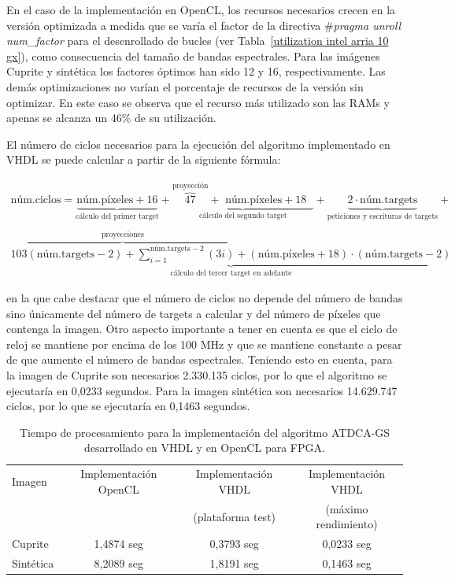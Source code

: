 En el caso de la implementación en OpenCL, los recursos necesarios crecen en la versión optimizada a medida que se varía el factor de la directiva \#\textit{pragma unroll num\_factor} para el desenrollado de bucles (ver Tabla~\ref{utilization intel arria 10 gx}), como consecuencia del tamaño de bandas espectrales. Para las imágenes Cuprite y sintética los factores óptimos han sido 12 y 16, respectivamente. Las demás optimizaciones no varían el porcentaje de recursos de la versión sin optimizar. En este caso se observa que el recurso más utilizado son las RAMs y apenas se alcanza un 46\% de su utilización.

El número de ciclos necesarios para la ejecución del algoritmo implementado en VHDL se puede calcular a partir de la siguiente fórmula:

\begin{gather}\label{eq:numero de ciclos algoritmo}
\text{núm.ciclos} = \underbrace{\text{núm.píxeles} + 16}_{\text{cálculo del primer target}} + \underbrace{\overbrace{47}^{\text{proyección}} + \text{ núm.píxeles} + 18\text{ }}_{\text{cálculo del segundo target}} + \underbrace{2 \cdot \text{núm.targets}}_{\text{peticiones y escrituras de targets}} + \nonumber\\\nonumber\\
\underbrace{\overbrace{103(\text{núm.targets} - 2) + \sum_{i=1}^{\text{núm.targets} - 2} (3i)}^{\text{proyecciones}} + (\text{núm.píxeles} + 18) \cdot (\text{núm.targets} - 2)}_{\text{cálculo del tercer target en adelante}}
\end{gather}


en la que cabe destacar que el número de ciclos no depende del número de bandas sino únicamente del número de targets a calcular y del número de píxeles que contenga la imagen. Otro aspecto importante a tener en cuenta es que el ciclo de reloj se mantiene por encima de los 100 MHz y que se mantiene constante a pesar de que aumente el número de bandas espectrales. Teniendo esto en cuenta, para la imagen de Cuprite son necesarios 2.330.135 ciclos, por lo que el algoritmo se ejecutaría en 0,0233 segundos. Para la imagen sintética son necesarios 14.629.747 ciclos, por lo que se ejecutaría en 0,1463 segundos.

\begin{table}[htbp]
	\centering
	\begin{tabular}{|l|c|c|c|}
		\hline
		Imagen & Implementación OpenCL & Implementación VHDL & Implementación VHDL \\
		 &  & (plataforma test) & (máximo rendimiento) \\ \hline \hline
		Cuprite & 1,4874 seg & 0,3793 seg & 0,0233 seg \\ \hline 
		Sintética & 8,2089 seg & 1,8191 seg & 0,1463 seg \\ \hline 
	\end{tabular}
	\caption{Tiempo de procesamiento para la implementación del algoritmo ATDCA-GS desarrollado en VHDL y en OpenCL para FPGA.}
	\label{tabla5}
\end{table}

